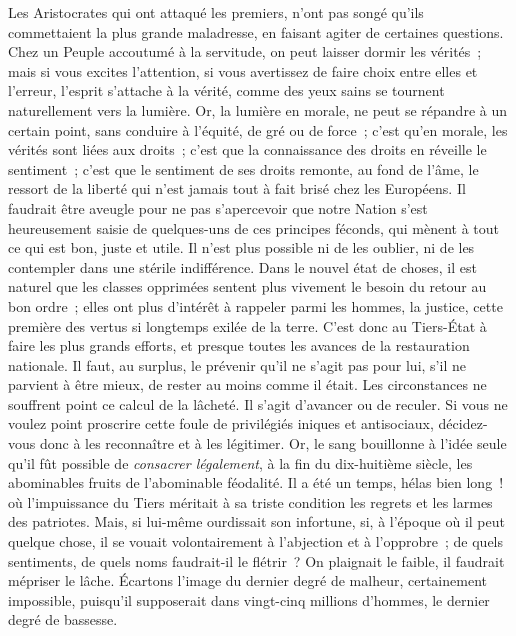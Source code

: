 \documentclass[french,twoside]{book} %
\begin{document}
Les Aristocrates qui ont attaqué les premiers, n’ont pas songé qu’ils commettaient la plus grande maladresse, en faisant agiter de certaines questions. Chez un Peuple accoutumé à la servitude, on peut laisser dormir les vérités ; mais si vous excites l’attention, si vous avertissez de faire choix entre elles et l’erreur, l’esprit s’attache à la vérité, comme des yeux sains se tournent naturellement vers la lumière. Or, la lumière en morale, ne peut se répandre à un certain point, sans conduire à l’équité, de gré ou de force ; c’est qu’en morale, les vérités sont liées aux droits ; c’est que la connaissance des droits en réveille le sentiment ; c’est que le sentiment de ses droits remonte, au fond de l’âme, le ressort de la liberté qui n’est jamais tout à fait brisé chez les Européens. Il faudrait être aveugle pour ne pas s’apercevoir que notre Nation s’est heureusement saisie de quelques-uns de ces principes féconds, qui mènent à tout ce qui est bon, juste et utile. Il n’est plus possible ni de les oublier, ni de les contempler dans une stérile indifférence. Dans le nouvel état de choses, il est naturel que les classes opprimées sentent plus vivement le besoin du retour au bon ordre ; elles ont plus d’intérêt à rappeler parmi les hommes, la justice, cette première des vertus si longtemps exilée de la terre. C’est donc au Tiers-État à faire les plus grands efforts, et presque toutes les avances de la restauration nationale. Il faut, au surplus, le prévenir qu’il ne s’agit pas pour lui, s’il ne parvient à être mieux, de rester au moins comme il était. Les circonstances ne souffrent point ce calcul de la lâcheté. Il s’agit d’avancer ou de reculer. Si vous ne voulez point proscrire cette foule de privilégiés iniques et antisociaux, décidez-vous donc à les reconnaître et à les légitimer. Or, le sang bouillonne à l’idée seule qu’il fût possible de {\itshape consacrer légalement}, à la fin du dix-huitième siècle, les abominables fruits de l’abominable féodalité. Il a été un temps, hélas bien long ! où l’impuissance du Tiers méritait à sa triste condition les regrets et les larmes des patriotes. Mais, si lui-même ourdissait son infortune, si, à l’époque où il peut quelque chose, il se vouait volontairement à l’abjection et à l’opprobre ; de quels sentiments, de quels noms faudrait-il le flétrir ? On plaignait le faible, il faudrait mépriser le lâche. Écartons l’image du dernier degré de malheur, certainement impossible, puisqu’il supposerait dans vingt-cinq millions d’hommes, le dernier degré de bassesse.\par
\end{document}
